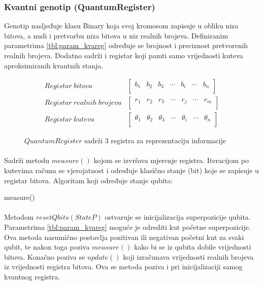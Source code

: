 \documentclass[times, utf8, zavrsni, numeric]{fer}
\begin{document}
\subsubsection{Kvantni genotip (QuantumRegister)}
Genotip nasljeđuje klasu Binary koja svoj kromosom zapisuje u obliku niza bitova, a nudi i pretvorbu niza bitova u niz realnih brojeva. Definiranim parametrima \ref{tbl:param_kvareg} određuje se brojnost i preciznost pretvorenih realnih brojeva. Dodatno sadrži i registar koji pamti samo vrijednosti kuteva aproksimiranih kvantnih stanja.
\begin{figure}[htb]
\centering
\begin{align*}
Registar\ bitova &
\begin{bmatrix}
b_1 & b_2 & b_3 & \cdots & b_i & \cdots & b_n \\
\end{bmatrix} \\
Registar\ realnih\ brojeva &
\begin{bmatrix}
r_1 & r_2 & r_3 & \cdots & r_j & \cdots & r_m \\
\end{bmatrix} \\
Registar\ kuteva &
\begin{bmatrix}
\theta_1 & \theta_2 & \theta_3 & \cdots & \theta_i & \cdots & \theta_n \\
\end{bmatrix}
\end{align*}
\caption{$QuantumRegister$ sadrži 3 registra za reprezentaciju informacije}
\end{figure}

\paragraph{}
Sadrži metodu $measure()$ kojom se izvršava mjerenje registra. Iteracijom po kutevima računa se vjerojatnost i određuje klasično stanje (bit) koje se zapisuje u registar bitova. Algoritam koji određuje stanje qubita:
\begin{algorithm}
\caption{measure()}
\label{algo:measure}
\begin{algorithmic}
\ENDFOR
\end{algorithmic}
\end{algorithm}

\paragraph{}
Metodom $resetQbits(StateP)$ ostvaruje se inicijalizacija superpozicije qubita. Parametrima \ref{tbl:param_kvareg} moguće je odrediti kut početne superpozicije. Ova metoda nasumično postavlja pozitivan ili negativan početni kut za svaki qubit, te nakon toga poziva $measure()$ kako bi se iz qubita dobile vrijednosti bitova. Konačno poziva se $update()$ koji izračunava vrijednosti realnih brojeva iz vrijednosti registra bitova. Ova se metoda poziva i pri inicijalizaciji samog kvantnog registra.
\end{document}
